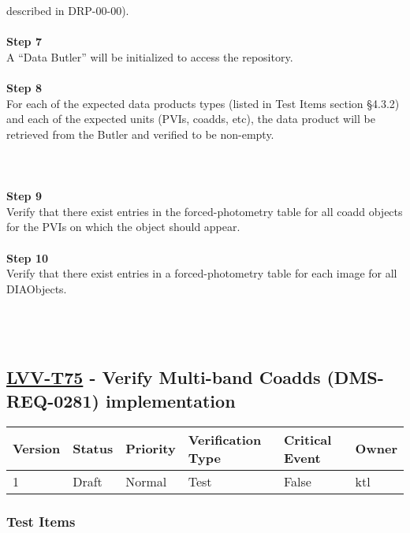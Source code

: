 described in DRP-00-00).\\
~\\
\textbf{Step 7}\\
A ``Data Butler'' will be initialized to access the repository.\\
~\\
\textbf{Step 8}\\
For each of the expected data products types (listed in Test Items
section §4.3.2) and each of the expected units (PVIs, coadds, etc), the
data product will be retrieved from the Butler and verified to be
non-empty.\\
~\\
~\\
~\\
\textbf{Step 9}\\
Verify that there exist entries in the forced-photometry table for all
coadd objects for the PVIs on which the object should appear.\\
~\\
\textbf{Step 10}\\
Verify that there exist entries in a forced-photometry table for each
image for all DIAObjects.\\
~\\
~\\
~\\

\hypertarget{lvv-t75---verify-multi-band-coadds-dms-req-0281-implementation}{%
\subsection{\texorpdfstring{\href{https://jira.lsstcorp.org/secure/Tests.jspa\#/testCase/LVV-T75}{LVV-T75}
- Verify Multi-band Coadds (DMS-REQ-0281)
implementation}{LVV-T75 - Verify Multi-band Coadds (DMS-REQ-0281) implementation}}\label{lvv-t75---verify-multi-band-coadds-dms-req-0281-implementation}}

\begin{longtable}[]{@{}llllll@{}}
\toprule
Version & Status & Priority & Verification Type & Critical Event &
Owner\tabularnewline
\midrule
\endhead
1 & Draft & Normal & Test & False & ktl\tabularnewline
\bottomrule
\end{longtable}

\hypertarget{test-items-7}{%
\subsubsection{Test Items}\label{test-items-7}}

